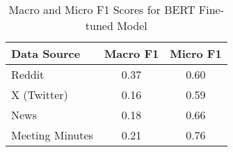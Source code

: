 \begin{table}[htbp]
\centering
\begin{tabular}{lcc}
\toprule
Data Source & Macro F1 & Micro F1 \\
\midrule
Reddit & 0.37 & 0.60 \\
X (Twitter) & 0.16 & 0.59 \\
News & 0.18 & 0.66 \\
Meeting Minutes & 0.21 & 0.76 \\
\bottomrule
\end{tabular}
\caption{Macro and Micro F1 Scores for BERT Fine-tuned Model}
\label{tab:bert_macro_micro}
\end{table}